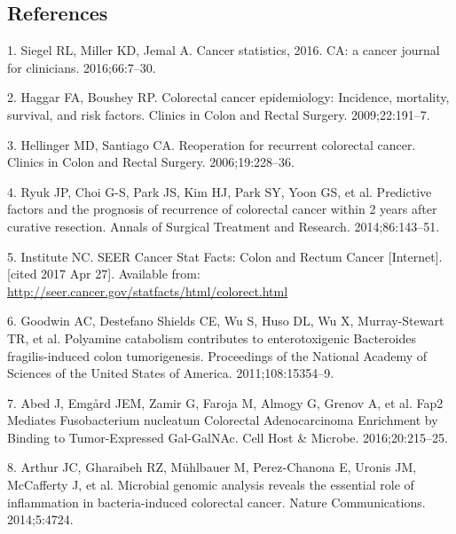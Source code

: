 \documentclass[12pt,]{article}
\begin{document}
\newpage

\subsection*{References}\label{references}

\hypertarget{refs}{}
\hypertarget{ref-siegel_cancer_2016}{}
1. Siegel RL, Miller KD, Jemal A. Cancer statistics, 2016. CA: a cancer
journal for clinicians. 2016;66:7--30.

\hypertarget{ref-haggar_colorectal_2009}{}
2. Haggar FA, Boushey RP. Colorectal cancer epidemiology: Incidence,
mortality, survival, and risk factors. Clinics in Colon and Rectal
Surgery. 2009;22:191--7.

\hypertarget{ref-hellinger_reoperation_2006}{}
3. Hellinger MD, Santiago CA. Reoperation for recurrent colorectal
cancer. Clinics in Colon and Rectal Surgery. 2006;19:228--36.

\hypertarget{ref-ryuk_predictive_2014}{}
4. Ryuk JP, Choi G-S, Park JS, Kim HJ, Park SY, Yoon GS, et al.
Predictive factors and the prognosis of recurrence of colorectal cancer
within 2 years after curative resection. Annals of Surgical Treatment
and Research. 2014;86:143--51.

\hypertarget{ref-national_cancer_institute_seer_nodate}{}
5. Institute NC. SEER Cancer Stat Facts: Colon and Rectum Cancer
{[}Internet{]}. {[}cited 2017 Apr 27{]}. Available from:
\url{http://seer.cancer.gov/statfacts/html/colorect.html}

\hypertarget{ref-goodwin_polyamine_2011}{}
6. Goodwin AC, Destefano Shields CE, Wu S, Huso DL, Wu X, Murray-Stewart
TR, et al. Polyamine catabolism contributes to enterotoxigenic
Bacteroides fragilis-induced colon tumorigenesis. Proceedings of the
National Academy of Sciences of the United States of America.
2011;108:15354--9.

\hypertarget{ref-abed_fap2_2016}{}
7. Abed J, Emgård JEM, Zamir G, Faroja M, Almogy G, Grenov A, et al.
Fap2 Mediates Fusobacterium nucleatum Colorectal Adenocarcinoma
Enrichment by Binding to Tumor-Expressed Gal-GalNAc. Cell Host \&
Microbe. 2016;20:215--25.

\hypertarget{ref-arthur_microbial_2014}{}
8. Arthur JC, Gharaibeh RZ, Mühlbauer M, Perez-Chanona E, Uronis JM,
McCafferty J, et al. Microbial genomic analysis reveals the essential
role of inflammation in bacteria-induced colorectal cancer. Nature
Communications. 2014;5:4724.
\end{document}
